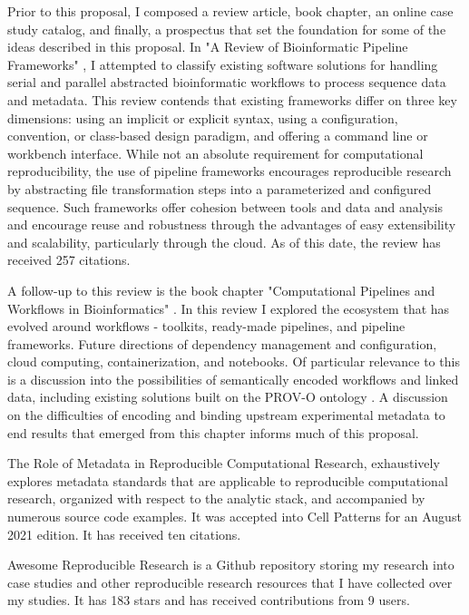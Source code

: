 \documentclass{drexelthesis}
\begin{document}
Prior to this proposal, I composed a review article, book chapter, an online case study catalog, and finally, a prospectus that set the foundation for some of the ideas described in this proposal. In "A Review of Bioinformatic Pipeline Frameworks" \cite{Leipzig2017-hv}, I attempted to classify existing software solutions for handling serial and parallel abstracted bioinformatic workflows to process sequence data and metadata. This review contends that existing frameworks differ on three key dimensions: using an implicit or explicit syntax, using a configuration, convention, or class-based design paradigm, and offering a command line or workbench interface. While not an absolute requirement for computational reproducibility, the use of pipeline frameworks encourages reproducible research by abstracting file transformation steps into a parameterized and configured sequence. Such frameworks offer cohesion between tools and data and analysis and encourage reuse and robustness through the advantages of easy extensibility and scalability, particularly through the cloud. As of this date, the review has received 257 citations.

A follow-up to this review is the book chapter "Computational Pipelines and Workflows in Bioinformatics" \cite{Leipzig2019-ag}. In this review I explored the ecosystem that has evolved around workflows - toolkits, ready-made pipelines, and pipeline frameworks. Future directions of dependency management and configuration, cloud computing, containerization, and notebooks. Of particular relevance to this is a discussion into the possibilities of semantically encoded workflows and linked data, including existing solutions built on the PROV-O ontology \cite{Belhajjame2013-at,Missier2013-ea}. A discussion on the difficulties of encoding and binding upstream experimental metadata to end results that emerged from this chapter informs much of this proposal.

The Role of Metadata in Reproducible Computational Research, exhaustively explores metadata standards that are applicable to reproducible computational research, organized with respect to the analytic stack, and accompanied by numerous source code examples. It was accepted into Cell Patterns for an August 2021 edition. It has received ten citations.

Awesome Reproducible Research \cite{Leipzig2019-am} is a Github repository storing my research into case studies and other reproducible research resources that I have collected over my studies. It has 183 stars and has received contributions from 9 users.
\end{document}
